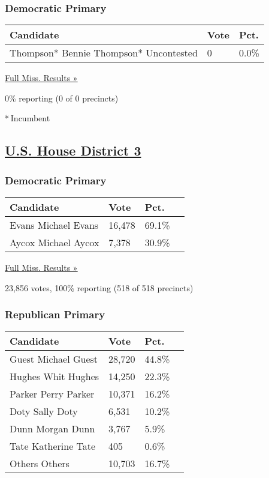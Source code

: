 \hypertarget{democratic-primary-2}{%
\subsubsection{Democratic Primary}\label{democratic-primary-2}}

\begin{longtable}[]{@{}lll@{}}
\toprule
Candidate & Vote & Pct.\tabularnewline
\midrule
\endhead
 Thompson* Bennie Thompson* Uncontested & 0 & 0.0\%\tabularnewline
\bottomrule
\end{longtable}

\href{https://www.nytimes3xbfgragh.onion/elections/results/mississippi}{Full
Miss. Results »}

0\% reporting (0 of 0 precincts)

* Incumbent

\hypertarget{us-house-district-3}{%
\subsection{\texorpdfstring{\href{https://www.nytimes3xbfgragh.onion/elections/results/mississippi-house-district-3-primary-election}{U.S.
House District 3}}{U.S. House District 3}}\label{us-house-district-3}}

\hypertarget{democratic-primary-3}{%
\subsubsection{Democratic Primary}\label{democratic-primary-3}}

\begin{longtable}[]{@{}llll@{}}
\toprule
Candidate & Vote & Pct. &\tabularnewline
\midrule
\endhead
 Evans Michael Evans & 16,478 & 69.1\% &\tabularnewline
 Aycox Michael Aycox & 7,378 & 30.9\% &\tabularnewline
\bottomrule
\end{longtable}

\href{https://www.nytimes3xbfgragh.onion/elections/results/mississippi}{Full
Miss. Results »}

23,856 votes, 100\% reporting (518 of 518 precincts)

\hypertarget{republican-primary-2}{%
\subsubsection{Republican Primary}\label{republican-primary-2}}

\begin{longtable}[]{@{}llll@{}}
\toprule
Candidate & Vote & Pct. &\tabularnewline
\midrule
\endhead
 Guest Michael Guest & 28,720 & 44.8\% &\tabularnewline
 Hughes Whit Hughes & 14,250 & 22.3\% &\tabularnewline
 Parker Perry Parker & 10,371 & 16.2\% &\tabularnewline
 Doty Sally Doty & 6,531 & 10.2\% &\tabularnewline
 Dunn Morgan Dunn & 3,767 & 5.9\% &\tabularnewline
 Tate Katherine Tate & 405 & 0.6\% &\tabularnewline
 Others Others & 10,703 & 16.7\% &\tabularnewline
\bottomrule
\end{longtable}

